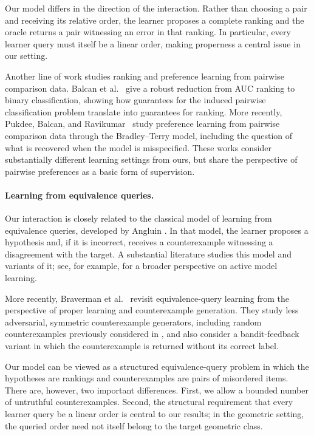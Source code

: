 \documentclass[11pt]{article}
\theoremstyle{definition}
\theoremstyle{remark}
\begin{document}
Our model differs in the direction of the interaction. Rather than choosing
a pair and receiving its relative order, the learner proposes a complete
ranking and the oracle returns a pair witnessing an error in that ranking.
In particular, every learner query must itself be a linear order, making
properness a central issue in our setting.

Another line of work studies ranking and preference learning from pairwise
comparison data. Balcan et al.~\cite{BalcanEtAl2007} give a robust reduction from AUC
ranking to binary classification, showing how guarantees for the induced
pairwise classification problem translate into guarantees for ranking. More recently, Pukdee, Balcan, and
Ravikumar~\cite{PukdeeBalcanRavikumar2026} study preference learning from
pairwise comparison data through the Bradley--Terry model, including the
question of what is recovered when the model is misspecified. These works consider substantially different learning settings from ours,
but share the perspective of pairwise preferences as a basic form of
supervision.

\paragraph{Learning from equivalence queries.}
Our interaction is closely related to the classical model of learning from
equivalence queries, developed by Angluin
\cite{Angluin1987,Angluin1988}. In that model, the learner proposes a
hypothesis and, if it is incorrect, receives a counterexample witnessing a
disagreement with the target.
A substantial literature studies this model and variants of it; see, for
example, \cite{Vaandrager2017} for a broader perspective on active model
learning.

More recently, Braverman et al.~\cite{BravermanEtAl2026} revisit
equivalence-query learning from the perspective of proper learning and
counterexample generation. They study less adversarial, symmetric
counterexample generators, including random counterexamples previously
considered in
\cite{AngluinDohrn2017,Bhatia2021,ChaseFreitagReyzin2024},
and also consider a bandit-feedback variant in which the counterexample is
returned without its correct label.

Our model can be viewed as a structured equivalence-query problem in which
the hypotheses are rankings and counterexamples are pairs of misordered
items. There are, however, two important differences. First, we allow a
bounded number of untruthful counterexamples. Second, the structural
requirement that every learner query be a linear order is central to our
results; in the geometric setting, the queried order need not itself belong
to the target geometric class.
\end{document}
